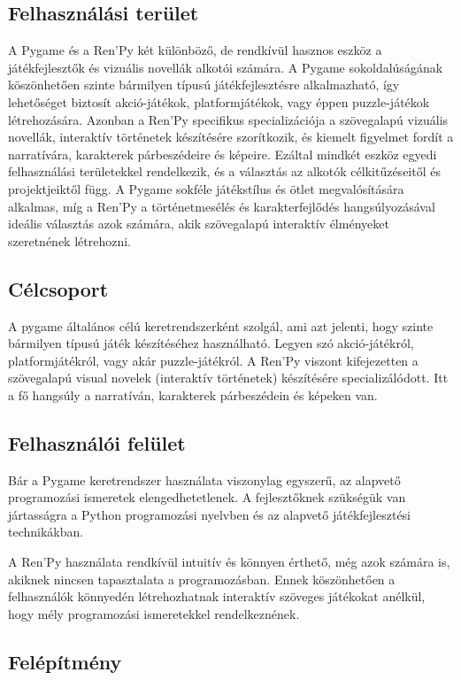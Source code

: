 \subsection{Felhasználási terület}
 A Pygame és a Ren'Py két különböző, de rendkívül hasznos eszköz a játékfejlesztők és vizuális novellák alkotói számára. A Pygame sokoldalúságának köszönhetően szinte bármilyen típusú játékfejlesztésre alkalmazható, így lehetőséget biztosít akció-játékok, platformjátékok, vagy éppen puzzle-játékok létrehozására. Azonban a Ren'Py specifikus specializációja a szövegalapú vizuális novellák, interaktív történetek készítésére szorítkozik, és kiemelt figyelmet fordít a narratívára, karakterek párbeszédeire és képeire. Ezáltal mindkét eszköz egyedi felhasználási területekkel rendelkezik, és a választás az alkotók célkitűzéseitől és projektjeiktől függ. A Pygame sokféle játékstílus és ötlet megvalósítására alkalmas, míg a Ren'Py a történetmesélés és karakterfejlődés hangsúlyozásával ideális választás azok számára, akik szövegalapú interaktív élményeket szeretnének létrehozni.

\subsection{Célcsoport}

 A pygame általános célú keretrendszerként szolgál, ami azt jelenti, hogy szinte bármilyen típusú játék készítéséhez használható. Legyen szó akció-játékról, platformjátékról, vagy akár puzzle-játékról.
A Ren'Py viszont kifejezetten a szövegalapú visual novelek (interaktív történetek) készítésére specializálódott. Itt a fő hangsúly a narratíván, karakterek párbeszédein és képeken van.

\subsection{Felhasználói felület}

 Bár a Pygame keretrendszer használata viszonylag egyszerű, az alapvető programozási ismeretek elengedhetetlenek. A fejlesztőknek szükségük van jártasságra a Python programozási nyelvben és az alapvető játékfejlesztési technikákban.

A Ren'Py használata rendkívül intuitív és könnyen érthető, még azok számára is, akiknek nincsen tapasztalata a programozásban. Ennek köszönhetően a felhasználók könnyedén létrehozhatnak interaktív szöveges játékokat anélkül, hogy mély programozási ismeretekkel rendelkeznének.
\subsection{Felépítmény}

